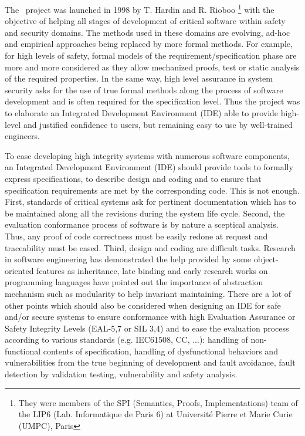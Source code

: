 


The \focal\ project was launched in 1998 by T. Hardin and R. Rioboo
\cite{HardinRiobooTSI04} \footnote{They were members of the SPI (Semantics, Proofs,
Implementations) team of the LIP6 (Lab. Informatique de Paris 6)
at Universit\'e Pierre et Marie Curie (UMPC), Paris}
 with the 
objective of helping all stages of  development of critical software
within safety and security domains. The  methods used in these domains
are evolving,
ad-hoc and empirical approaches  being replaced by more formal
methods. For example, for high levels of safety, formal models of the
requirement/specification phase are more and more considered as they
allow mechanized proofs, test or static analysis of the required
properties.  In the same way, high level assurance in system security asks for
the use of true formal methods along the process of software
development and is often required for the specification level.
Thus  the project was to elaborate an Integrated
Development Environment (IDE) able to provide high-level and justified
confidence to users, but remaining easy to use by well-trained
engineers.

To ease developing high integrity systems with numerous software
components, an Integrated Development Environment (IDE) should provide
tools to formally express specifications, to describe design and
coding and to ensure that specification requirements are met by the
corresponding code. This is not
enough. First, standards of critical systems ask for pertinent
documentation which has to be maintained along all the revisions
during the system life cycle. Second, the evaluation conformance
process of software is by nature a sceptical analysis. Thus, any proof
of code correctness must be easily redone at request and traceability
must be eased. Third, design
and coding are difficult tasks. Research in software engineering has
demonstrated the help provided by some object-oriented 
features as inheritance, late binding and early research works on
programming languages have pointed out the importance of abstraction
mechanism such as modularity to help invariant maintaining. There are
a lot of other points which should also be considered when designing
an IDE for safe and/or secure systems to ensure conformance with high
Evaluation Assurance or Safety Integrity Levels (EAL-5,7 or SIL 3,4)
and to ease the evaluation process according to various standards
(e.g. IEC61508, CC, ...): handling of non-functional contents of
specification, handling of dysfunctional behaviors and vulnerabilities
from the true beginning of development and fault avoidance, fault
detection by validation testing, vulnerability and safety analysis.

